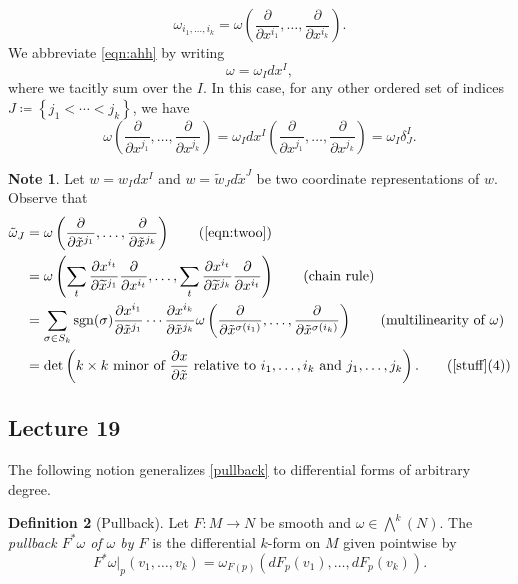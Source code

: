 \documentclass[10pt,letterpaper,cm]{nupset}
\theoremstyle{definition}
\newtheorem{definition}{Definition}[subsection]
\newtheorem{note}[definition]{Note}
\theoremstyle{theorem}
\theoremstyle{remark}
\newcommand{\1}{\mathbf{1}}
\newcommand{\0}{\vec 0}
\DeclareMathOperator{\sgn}{sgn}
\begin{document}
\[
\label{eqn:twoo}
\omega_{i_1, \ldots, i_k}  = \omega\left(\frac{\partial}{\partial{x^{i_1}}}, \ldots, \frac{\partial}{\partial{x^{i_k}}}\right).
\tag{2} \] We abbreviate \eqref{eqn:ahh} by writing $$\omega = \omega_I dx^I,$$ where we tacitly sum over the $I$. In this case, for any other ordered set of indices $J \coloneqq \left\{j_1< \cdots < j_k\right\}$, we have 
\[
\omega\left(\frac{\partial}{\partial x^{j_{1}}}, \dots, \frac{\partial}{\partial x^{j_{k}}}\right)=\omega_{I} d x^{I}\left(\frac{\partial}{\partial x^{j_{1}}}, \dots, \frac{\partial}{\partial x^{j_{k}}}\right) = \omega_I{\delta_J^I}.
\]


\begin{note}
Let $w = w_Idx^I$ and $ w= \tilde{w}_J d\tilde{x}^J$ be two coordinate representations of $w$.  Observe that 
\begin{align*}
\tilde{\omega}_J & = \omega\left(\frac{\partial}{\partial{\tilde{x}^{j_1}}}, \ldots,  \frac{\partial}{\partial{\tilde{x}^{j_k}}}\right)  \tag{\eqref{eqn:twoo}}
\\ & = \omega\left(\sum_{t} \frac{\partial x^{i_t}}{\partial \widetilde{x}^{j_{1}}} \frac{\partial}{\partial x^{i_t}}, \ldots, \sum_{t} \frac{\partial x^{i_t}}{\partial \widetilde{x}^{j_{k}}} \frac{\partial}{\partial x^{i_t}}\right) \tag{\text{chain rule}}
\\ & = \sum_{\sigma\in S_k}\sgn(\sigma)\frac{\partial{x^{i_1}}}{\partial{\tilde{x}^{j_1}}}\cdots \frac{\partial{x^{i_k}}}{\partial{\tilde{x}^{j_k}}}\omega\left(\frac{\partial}{\partial{\tilde{x}^{\sigma(i_1)}}}, \ldots, \frac{\partial}{\partial{\tilde{x}^{\sigma(i_k)}}} \right)  \tag{\text{multilinearity} of $\omega$}
\\ & =  \det\left(k \times k \text{ minor of }\frac{\partial{x}}{\partial{\tilde{x}}} \text{ relative to } i_1, \ldots, i_k \text{ and }j_1, \ldots, j_k\right). \tag{\cref{stuff}(4)}
\end{align*}
\end{note} 

\subsection{Lecture 19}

The following notion generalizes \cref{pullback} to differential forms of arbitrary degree.

\begin{definition}[Pullback]\label{PB}
Let $F: M \to N$ be smooth and $\omega \in \bigwedge^k(N)$.  The \textit{pullback $F^{\ast}\omega$ of $\omega$ by $F$} is the differential $k$-form on $M$ given pointwise by 
\[ 
F^{\ast} \omega\bigr\rvert_p(v_1, \ldots, v_k) = \omega_{F(p)}\left(dF_p(v_1), \ldots, dF_p(v_k)\right). 
\]
\end{definition}
\end{document}
